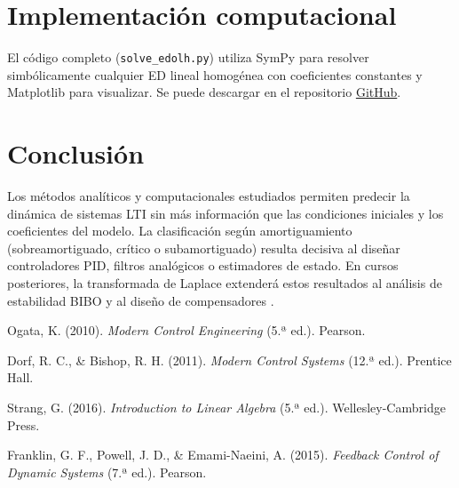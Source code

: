 \documentclass[stu,12pt,a4paper,hidelinks]{apa7}
\begin{document}
\section{Implementación computacional}
El código completo (\texttt{solve\_edolh.py}) utiliza SymPy para resolver simbólicamente cualquier ED lineal homogénea con coeficientes constantes y Matplotlib para visualizar. Se puede descargar en el repositorio \href{https://github.com/jcgomez/edolh}{GitHub}.

\section{Conclusión}
Los métodos analíticos y computacionales estudiados permiten predecir la dinámica de sistemas LTI sin más información que las condiciones iniciales y los coeficientes del modelo. La clasificación según amortiguamiento (sobreamortiguado, crítico o subamortiguado) resulta decisiva al diseñar controladores PID, filtros analógicos o estimadores de estado. En cursos posteriores, la transformada de Laplace extenderá estos resultados al análisis de estabilidad BIBO y al diseño de compensadores \citep{franklin2015feedback}.

\begin{thebibliography}{}

Ogata, K. (2010). \emph{Modern Control Engineering} (5.ª ed.). Pearson.

Dorf, R. C., \& Bishop, R. H. (2011). \emph{Modern Control Systems} (12.ª ed.). Prentice Hall.

Strang, G. (2016). \emph{Introduction to Linear Algebra} (5.ª ed.). Wellesley-Cambridge Press.

Franklin, G. F., Powell, J. D., \& Emami-Naeini, A. (2015). \emph{Feedback Control of Dynamic Systems} (7.ª ed.). Pearson.

\end{thebibliography}
\end{document}
